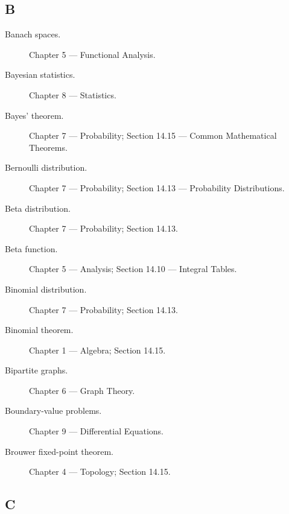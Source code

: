 \subsection*{B}

\begin{description}

\item[Banach spaces.]
Chapter 5 --- Functional Analysis.

\item[Bayesian statistics.]
Chapter 8 --- Statistics.

\item[Bayes' theorem.]
Chapter 7 --- Probability;
Section 14.15 --- Common Mathematical Theorems.

\item[Bernoulli distribution.]
Chapter 7 --- Probability;
Section 14.13 --- Probability Distributions.

\item[Beta distribution.]
Chapter 7 --- Probability;
Section 14.13.

\item[Beta function.]
Chapter 5 --- Analysis;
Section 14.10 --- Integral Tables.

\item[Binomial distribution.]
Chapter 7 --- Probability;
Section 14.13.

\item[Binomial theorem.]
Chapter 1 --- Algebra;
Section 14.15.

\item[Bipartite graphs.]
Chapter 6 --- Graph Theory.

\item[Boundary-value problems.]
Chapter 9 --- Differential Equations.

\item[Brouwer fixed-point theorem.]
Chapter 4 --- Topology;
Section 14.15.

\end{description}

\subsection*{C}

